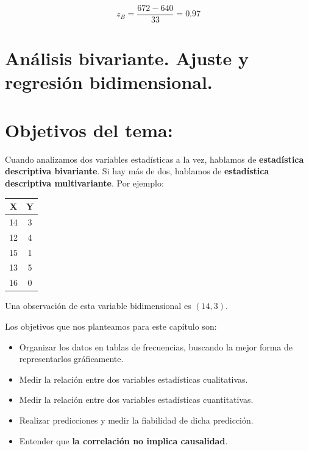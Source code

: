 \documentclass[]{book}
\theoremstyle{definition}
\theoremstyle{definition}
\theoremstyle{definition}
\theoremstyle{remark}
\begin{document}
\[z_B=\frac{672-640}{33}=0.97\]

\chapter{Análisis bivariante. Ajuste y regresión
bidimensional.}\label{analisis-bivariante.-ajuste-y-regresion-bidimensional.}

\chapter{Objetivos del tema:}\label{objetivos-del-tema}

Cuando analizamos dos variables estadísticas a la vez, hablamos de
\textbf{estadística descriptiva bivariante}. Si hay más de dos, hablamos
de \textbf{estadística descriptiva multivariante}. Por ejemplo:

\begin{longtable}[]{@{}cc@{}}
\toprule
X & Y\tabularnewline
\midrule
\endhead
14 & 3\tabularnewline
12 & 4\tabularnewline
15 & 1\tabularnewline
13 & 5\tabularnewline
16 & 0\tabularnewline
\bottomrule
\end{longtable}

Una observación de esta variable bidimensional es \((14,3)\).

Los objetivos que nos planteamos para este capítulo son:

\begin{itemize}
\item
  Organizar los datos en tablas de frecuencias, buscando la mejor forma
  de representarlos gráficamente.
\item
  Medir la relación entre dos variables estadísticas cualitativas.
\item
  Medir la relación entre dos variables estadísticas cuantitativas.
\item
  Realizar predicciones y medir la fiabilidad de dicha predicción.
\item
  Entender que \textbf{la correlación no implica causalidad}.
\end{itemize}


\end{document}
